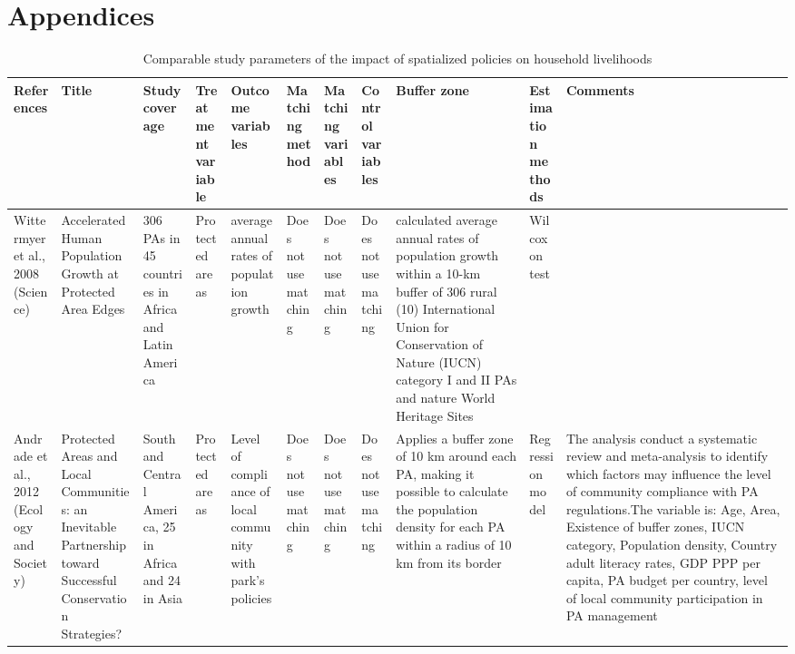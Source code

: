 \documentclass[
]{article}
\begin{document}
\newpage

\section{Appendices}\label{sec-appendix}

\begin{landscape} %

    \normalsize 
    \begin{longtable}{|p{1.6cm}|p{1.5cm}|p{1.5cm}|p{1.5cm}|p{1.7cm}|p{1.6 cm}|p{1.9cm}|p{1.9cm}|p{2 cm}|p{1.5cm}|p{2 cm}|} 
    \caption{Comparable study parameters of the impact of spatialized policies on household livelihoods} \\
    \hline
    \textbf{References} & \textbf{Title} & \textbf{Study coverage} & \textbf{Treatment variable} & \textbf{Outcome variables} & \textbf{Matching method} & \textbf{Matching variables} & \textbf{Control variables} & \textbf{Buffer zone} & \textbf{Estimation methods} & \textbf{Comments} \\  
    \hline
    \endfirsthead
    
   
       Wittermyer et al., 2008 (Science) & Accelerated Human Population Growth at Protected Area Edges & 306 PAs in 45 countries in Africa and Latin America & Protected areas & average annual rates of population growth & Does not use matching & Does not use matching & Does not use matching & calculated average annual rates of population growth within a 10-km buffer of 306 rural (10) International Union for Conservation of Nature (IUCN) category I and II PAs and nature World Heritage Sites & Wilcoxon test & ~  \\ 
        \hline
        
        Andrade et al., 2012 (Ecology and Society) & Protected Areas and Local Communities: an Inevitable Partnership toward Successful Conservation Strategies? & South and Central America, 25 in Africa and 24 in Asia & Protected areas & Level of compliance of local community with park's policies & Does not use matching & Does not use matching & Does not use matching & Applies a buffer zone of 10 km around each PA, making it possible to calculate the population density for each PA within a radius of 10 km from its border & Regression model & The analysis conduct a systematic review and meta-analysis to identify which factors may influence the level of community compliance with PA regulations.The variable is: Age, Area, Existence of buffer zones, IUCN category, Population density, Country adult literacy rates, GDP PPP per capita, PA budget per country, level of local community participation in PA management \\
        \hline
        

\end{longtable}
\end{landscape}
\end{document}
